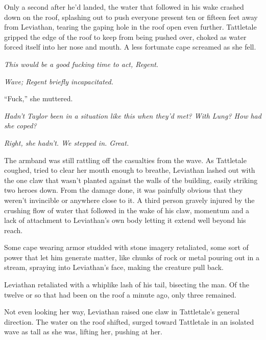 Only a second after he'd landed, the water that followed in his wake crashed down on the roof, splashing out to push everyone present ten or fifteen feet away from Leviathan, tearing the gaping hole in the roof open even further.  Tattletale gripped the edge of the roof to keep from being pushed over, choked as water forced itself into her nose and mouth.  A less fortunate cape screamed as she fell.



\emph{This would be a good fucking time to act, Regent}.



\emph{Wave; Regent briefly incapacitated.}



``Fuck,'' she muttered.



\emph{Hadn't Taylor been in a situation like this when they'd met?  With Lung?  How had she coped?}



\emph{Right, she hadn't.  We stepped in.  Great.}



The armband was still rattling off the casualties from the wave.  As Tattletale coughed, tried to clear her mouth enough to breathe, Leviathan lashed out with the one claw that wasn't planted against the walls of the building, easily striking two heroes down.  From the damage done, it was painfully obvious that they weren't invincible or anywhere close to it.  A third person gravely injured by the crushing flow of water that followed in the wake of his claw, momentum and a lack of attachment to Leviathan's own body letting it extend well beyond his reach.



Some cape wearing armor studded with stone imagery retaliated, some sort of power that let him generate matter, like chunks of rock or metal pouring out in a stream, spraying into Leviathan's face, making the creature pull back.



Leviathan retaliated with a whiplike lash of his tail, bisecting the man.  Of the twelve or so that had been on the roof a minute ago, only three remained.



Not even looking her way, Leviathan raised one claw in Tattletale's general direction.  The water on the roof shifted, surged toward Tattletale in an isolated wave as tall as she was, lifting her, pushing at her.




